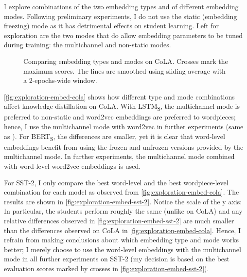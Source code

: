 \documentclass[bsc,frontabs,twoside,singlespacing,parskip,deptreport]{infthesis}
\def\BERTS{BERT\textsubscript{S}}
\def\LSTMS{LSTM\textsubscript{S}}
\def\sliding{The lines are smoothed using sliding average with a 2-epochs-wide window.}
\begin{document}
{{{{        I explore combinations of the two embedding types and of different embedding modes. Following preliminary experiments, I do not use the static (embedding freezing) mode as it has detrimental effects on student learning. Left for exploration are the two modes that do allow embedding parameters to be tuned during training: the multichannel and non-static modes.

        \begin{figure}[h!t]
          \centering
          \caption{Comparing embedding types and modes on CoLA. Crosses mark the maximum scores. \sliding}
          \label{fig:exploration-embed-cola}
        \end{figure}

        \autoref{fig:exploration-embed-cola} shows how different type and mode combinations affect knowledge distillation on CoLA. With \LSTMS, the multichannel mode is preferred to non-static and word2vec embeddings are preferred to wordpieces; hence, I use the multichannel mode with word2vec in further experiments (same as \citet{Tang_2019b}). For \BERTS, the differences are smaller, yet it is clear that word-level embeddings benefit from using the frozen and unfrozen versions provided by the multichannel mode. In further experiments, the multichannel mode combined with word-level word2vec embeddings is used.

        For SST-2, I only compare the best word-level and the best wordpiece-level combination for each model as observed from \autoref{fig:exploration-embed-cola}. The results are shown in \autoref{fig:exploration-embed-sst-2}. Notice the scale of the y axis: In particular, the students perform roughly the same (unlike on CoLA) and any relative differences observed in \autoref{fig:exploration-embed-sst-2} are much smaller than the differences observed on CoLA in \autoref{fig:exploration-embed-cola}. Hence, I refrain from making conclusions about which embedding type and mode works better; I merely choose to use the word-level embeddings with the multichannel mode in all further experiments on SST-2 (my decision is based on the best evaluation scores marked by crosses in \autoref{fig:exploration-embed-sst-2}).

}}}}
\end{document}
